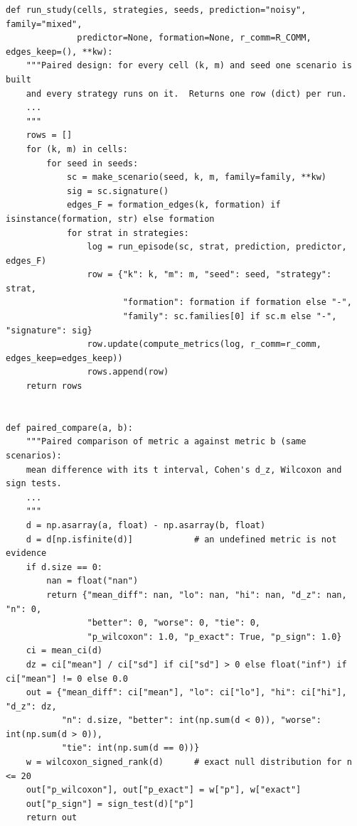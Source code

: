 \begin{lstlisting}[caption={The paired runner and the paired comparison (from \code{code/ch25\_evaluation.py}; the docstrings are abridged at the ellipses). The two levels that \cref{sec:ch25-design} adds to the runner are its \code{predictor} and \code{formation} arguments.},label={lst:ch25-paired}]
def run_study(cells, strategies, seeds, prediction="noisy", family="mixed",
              predictor=None, formation=None, r_comm=R_COMM, edges_keep=(), **kw):
    """Paired design: for every cell (k, m) and seed one scenario is built
    and every strategy runs on it.  Returns one row (dict) per run.
    ...
    """
    rows = []
    for (k, m) in cells:
        for seed in seeds:
            sc = make_scenario(seed, k, m, family=family, **kw)
            sig = sc.signature()
            edges_F = formation_edges(k, formation) if isinstance(formation, str) else formation
            for strat in strategies:
                log = run_episode(sc, strat, prediction, predictor, edges_F)
                row = {"k": k, "m": m, "seed": seed, "strategy": strat,
                       "formation": formation if formation else "-",
                       "family": sc.families[0] if sc.m else "-", "signature": sig}
                row.update(compute_metrics(log, r_comm=r_comm, edges_keep=edges_keep))
                rows.append(row)
    return rows


def paired_compare(a, b):
    """Paired comparison of metric a against metric b (same scenarios):
    mean difference with its t interval, Cohen's d_z, Wilcoxon and sign tests.
    ...
    """
    d = np.asarray(a, float) - np.asarray(b, float)
    d = d[np.isfinite(d)]            # an undefined metric is not evidence
    if d.size == 0:
        nan = float("nan")
        return {"mean_diff": nan, "lo": nan, "hi": nan, "d_z": nan, "n": 0,
                "better": 0, "worse": 0, "tie": 0,
                "p_wilcoxon": 1.0, "p_exact": True, "p_sign": 1.0}
    ci = mean_ci(d)
    dz = ci["mean"] / ci["sd"] if ci["sd"] > 0 else float("inf") if ci["mean"] != 0 else 0.0
    out = {"mean_diff": ci["mean"], "lo": ci["lo"], "hi": ci["hi"], "d_z": dz,
           "n": d.size, "better": int(np.sum(d < 0)), "worse": int(np.sum(d > 0)),
           "tie": int(np.sum(d == 0))}
    w = wilcoxon_signed_rank(d)      # exact null distribution for n <= 20
    out["p_wilcoxon"], out["p_exact"] = w["p"], w["exact"]
    out["p_sign"] = sign_test(d)["p"]
    return out
\end{lstlisting}

